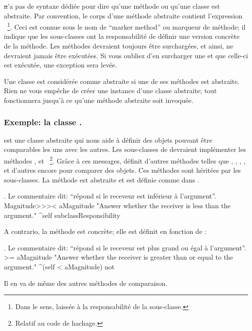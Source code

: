 \documentclass[a4paper,10pt,twoside]{book}
\begin{document}
\st n'a pas de syntaxe d\'edi\'ee pour dire qu'une m\'ethode ou qu'une classe est abstraite. 
Par convention, le corps d'une m\'ethode abstraite contient l'expression ~\footnote{Dans le sens, laiss\'ee \`a la responsabilit\'e de la sous-classe.}. 
Ceci est connue sous le nom de ``marker method'' ou marqueur de m\'ethode; il indique que les sous-classes ont la responsabilit\'e de d\'efinir une version concr\`ete de la m\'ethode. 
Les m\'ethodes  devraient toujours \^etre surcharg\'ees, et ainsi, ne devraient jamais \^etre ex\'ecut\'ees.
Si vous oubliez d'en surcharger une et que celle-ci est ex\'ecut\'ee, une exception sera lev\'ee. 

Une classe est consid\'er\'ee comme abstraite si une de ses m\'ethodes est abstraite.
Rien ne vous emp\^eche de cr\'eer une instance d'une classe abstraite; tout fonctionnera jusqu'\`a ce qu'une m\'ethode abstraite soit invoqu\'ee. 

\subsubsection{Exemple: la classe .}
 est une classe abstraite qui nous aide \`a d\'efinir
des objets pouvant \^etre comparables les uns avec les autres. Les
sous-classes de  devraient impl\'ementer les m\'ethodes
\ct{<}, \ct{=} et ~\footnote{Relatif au code de hachage.}.
Gr\^ace \`a ces messages,  d\'efinit d'autres m\'ethodes telles que
\ct{>}, \ct{>=}, \ct{<=}, ,   et
d'autres encore pour comparer des objets.
Ces m\'ethodes sont h\'erit\'ees par les sous-classes.
La m\'ethode  est abstraite et est d\'efinie comme
dans .

\begin{method}[MagnitudeLessThan]{. Le commentaire dit: ``r\'epond si le receveur est inf\'erieur \`a l'argument''.}
Magnitude>>>< aMagnitude 
	"Answer whether the receiver is less than the argument."
	^self subclassResponsibility
\end{method}

\noindent
A contrario, la m\'ethode  est concr\`ete; elle est d\'efinit en fonction de \ct{<}:

\begin{method}[Magnitude>=]{. Le commentaire dit: ``r\'epond si le receveur est plus grand ou \'egal \`a l'argument''.}
>= aMagnitude 
	"Answer whether the receiver is greater than or equal to the argument."
	^(self < aMagnitude) not
\end{method}
Il en va de m\^eme des autres m\'ethodes de comparaison.
\end{document}
